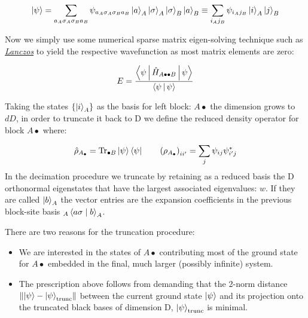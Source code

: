 \documentclass{article}
\begin{document}
\[
\ket{ \psi } = \sum_{a_A \sigma_A \sigma_B a_B} \psi_{a_A \sigma_A \sigma_B a_B} 
\Ket{a}_A \Ket{\sigma}_A \Ket{\sigma}_B \Ket{a}_B 
\equiv \sum_{i_A j_B} \psi_{i_A j_B} \Ket{i}_A \Ket{j}_B
\]

\noindent Now we simply use some numerical sparse matrix eigen-solving technique such as \href{https://en.wikipedia.org/wiki/Lanczos_algorithm}{\emph{Lanczos}} to yield the respective wavefunction as most matrix elements are zero: 

\[
E= \frac{\Braket{\psi | \hat{H}_{A \bullet \bullet B} | \psi}}{\Braket{\psi | \psi}}
\]

\noindent Taking the states $\{ \ket{i}_A\}$ as the basis for left block: $A \bullet$ the dimension grows to $dD$, in order to truncate it back to D we define the reduced density operator for block $A \bullet$ where: 

\[
\hat{\rho}_{A_\bullet} = \mathrm{Tr}_{\bullet B} \Ket{\psi} \Bra{\psi} \qquad 
\left( \rho_{A_\bullet} \right)_{ii'} = \sum_j \psi_{ij} \psi^*_{i'j}
\]
\noindent In the decimation procedure we truncate by retaining as a reduced basis the D orthonormal eigenstates that have the largest associated eigenvalues: $w$. If they are called $\ket{b}_A$ the vector entries are the expansion coefficients in the previous block-site basis $_A\braket{a \sigma \mid b}_A$.

\vspace{1em}

\noindent There are two reasons for the truncation procedure:
\begin{itemize}
    \item We are interested in the states of $A\bullet$ contributing most of the ground state for $A\bullet$ embedded in the final, much larger (possibly infinite) system. 
    \item The prescription above follows from demanding that the 2-norm distance $\lVert \ket \psi - \ket \psi_{\text{trunc}} \rVert$ between the current ground state $\ket \psi$ and its projection onto the truncated black bases of dimension D, $\ket \psi_{\text{trunc}}$ is minimal. 
\end{itemize}
\end{document}
